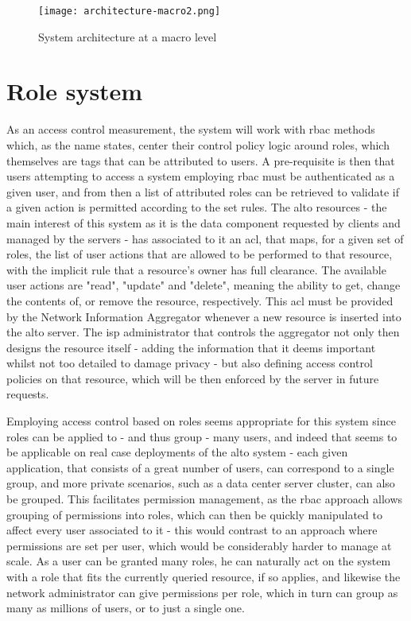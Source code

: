 \begin{figure}[H]
        \centering
        \hspace*{-4em}
        \texttt{[image: architecture-macro2.png]}
        \caption{System architecture at a macro level}
        \label{fig:macro-architecture}
\end{figure}

\section{Role system}
\label{sec:system-roles}

    As an access control measurement, the system will work with \gls{rbac} methods which, as the name states, center their control policy logic around roles, which themselves are tags that can be attributed to users.
    A pre-requisite is then that users attempting to access a system employing \gls{rbac} must be authenticated as a given user, and from then a list of attributed roles can be retrieved to validate if a given action is permitted according to the set rules.
    The \gls{alto} resources - the main interest of this system as it is the data component requested by clients and managed by the servers - has associated to it an \gls{acl}, that maps, for a given set of roles, the list of user actions that are allowed to be performed to that resource, with the implicit rule that a resource's owner has full clearance.
    The available user actions are "read", "update" and "delete", meaning the ability to get, change the contents of, or remove the resource, respectively.
    This \gls{acl} must be provided by the Network Information Aggregator whenever a new resource is inserted into the \gls{alto} server.
    The \gls{isp} administrator that controls the aggregator not only then designs the resource itself - adding the information that it deems important whilst not too detailed to damage privacy - but also defining access control policies on that resource, which will be then enforced by the server in future requests.

    Employing access control based on roles seems appropriate for this system since roles can be applied to - and thus group - many users, and indeed that seems to be applicable on real case deployments of the \gls{alto} system - each given application, that consists of a great number of users, can correspond to a single group, and more private scenarios, such as a data center server cluster, can also be grouped.
    This facilitates permission management, as the \gls{rbac} approach allows grouping of permissions into roles, which can then be quickly manipulated to affect every user associated to it - this would contrast to an approach where permissions are set per user, which would be considerably harder to manage at scale.
    As a user can be granted many roles, he can naturally act on the system with a role that fits the currently queried resource, if so applies, and likewise the network administrator can give permissions per role, which in turn can group as many as millions of users, or to just a single one.

